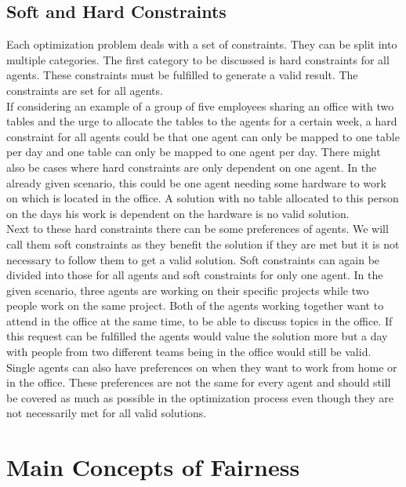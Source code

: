 \documentclass[german, a4paper, 11pt, oneside]{scrbook}
\begin{document}
\subsection{Soft and Hard Constraints}
Each optimization problem deals with a set of constraints. They can be split into multiple categories. The first category to be discussed is hard constraints for all agents. These constraints must be fulfilled to generate a valid result. The constraints are set for all agents.\cite{Ek} \\If considering an example of a group of five employees sharing an office with two tables and the urge to allocate the tables to the agents for a certain week, a hard constraint for all agents could be that one agent can only be mapped to one table per day and one table can only be mapped to one agent per day. There might also be cases where hard constraints are only dependent on one agent. In the already given scenario, this could be one agent needing some hardware to work on which is located in the office. A solution with no table allocated to this person on the days his work is dependent on the hardware is no valid solution. \\Next to these hard constraints there can be some preferences of agents. We will call them soft constraints as they benefit the solution if they are met but it is not necessary to follow them to get a valid solution. \cite{Cornelio,Ek, Meseguer.2006} Soft constraints can again be divided into those for all agents and soft constraints for only one agent. In the given scenario, three agents are working on their specific projects while two people work on the same project. Both of the agents working together want to attend in the office at the same time, to be able to discuss topics in the office. If this request can be fulfilled the agents would value the solution more but a day with people from two different teams being in the office would still be valid. \\Single agents can also have preferences on when they want to work from home or in the office. These preferences are not the same for every agent and should still be covered as much as possible in the optimization process even though they are not necessarily met for all valid solutions. \cite{Ek}


\section{Main Concepts of Fairness}
\end{document}
